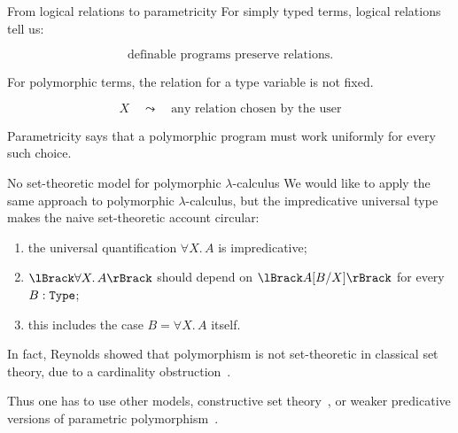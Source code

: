 \begin{frame}{From logical relations to parametricity}
  For simply typed terms, logical relations tell us:

  \[
    \text{definable programs preserve relations.}
  \]

  \vfill

  For polymorphic terms, the relation for a type variable is not fixed.

  \[
    X \quad\leadsto\quad \text{any relation chosen by the user}
  \]

  \vfill

  Parametricity says that a polymorphic program must work uniformly for every
  such choice.
\end{frame}

\begin{frame}{No set-theoretic model for polymorphic $\lambda$-calculus}
  We would like to apply the same approach to polymorphic $\lambda$-calculus,
  but the impredicative universal type makes the naive set-theoretic account
  circular:
  \begin{enumerate}
    \item the universal quantification $\forall X.\,A$ is \alert{impredicative};
    \item $\Brackets{\forall X.\,A}$ should depend on
      $\Brackets{A\subst{B}{X}}$ for every $B : \mathtt{Type}$;
    \item this includes the case $B = \forall X.\,A$ itself.
  \end{enumerate}

  In fact, Reynolds showed that polymorphism is not set-theoretic in classical
  set theory, due to a cardinality obstruction~\cite{Reynolds1984}.

  Thus one has to use other models, constructive set theory~\cite{Pitts1987},
  or weaker predicative versions of parametric polymorphism~\cite{Leivant1991}.
\end{frame}

